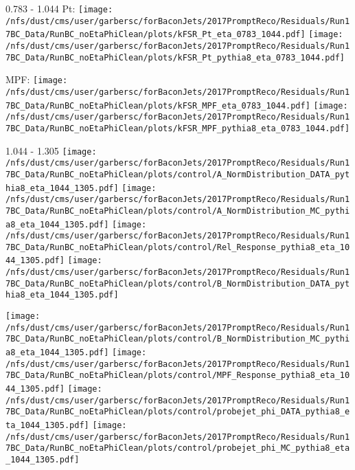 \documentclass[t,compress]{beamer}
\begin{document}
\begin{frame}{0.783 - 1.044}
	 Pt: \texttt{[image: /nfs/dust/cms/user/garbersc/forBaconJets/2017PromptReco/Residuals/Run17BC\_Data/RunBC\_noEtaPhiClean/plots/kFSR\_Pt\_eta\_0783\_1044.pdf]}
	\texttt{[image: /nfs/dust/cms/user/garbersc/forBaconJets/2017PromptReco/Residuals/Run17BC\_Data/RunBC\_noEtaPhiClean/plots/kFSR\_Pt\_pythia8\_eta\_0783\_1044.pdf]}
\newline

	 MPF: \texttt{[image: /nfs/dust/cms/user/garbersc/forBaconJets/2017PromptReco/Residuals/Run17BC\_Data/RunBC\_noEtaPhiClean/plots/kFSR\_MPF\_eta\_0783\_1044.pdf]}
	\texttt{[image: /nfs/dust/cms/user/garbersc/forBaconJets/2017PromptReco/Residuals/Run17BC\_Data/RunBC\_noEtaPhiClean/plots/kFSR\_MPF\_pythia8\_eta\_0783\_1044.pdf]}
\end{frame}

\begin{frame}{1.044 - 1.305}
	\texttt{[image: /nfs/dust/cms/user/garbersc/forBaconJets/2017PromptReco/Residuals/Run17BC\_Data/RunBC\_noEtaPhiClean/plots/control/A\_NormDistribution\_DATA\_pythia8\_eta\_1044\_1305.pdf]}
	\texttt{[image: /nfs/dust/cms/user/garbersc/forBaconJets/2017PromptReco/Residuals/Run17BC\_Data/RunBC\_noEtaPhiClean/plots/control/A\_NormDistribution\_MC\_pythia8\_eta\_1044\_1305.pdf]}
	\texttt{[image: /nfs/dust/cms/user/garbersc/forBaconJets/2017PromptReco/Residuals/Run17BC\_Data/RunBC\_noEtaPhiClean/plots/control/Rel\_Response\_pythia8\_eta\_1044\_1305.pdf]}
	\texttt{[image: /nfs/dust/cms/user/garbersc/forBaconJets/2017PromptReco/Residuals/Run17BC\_Data/RunBC\_noEtaPhiClean/plots/control/B\_NormDistribution\_DATA\_pythia8\_eta\_1044\_1305.pdf]}
\newline

	\texttt{[image: /nfs/dust/cms/user/garbersc/forBaconJets/2017PromptReco/Residuals/Run17BC\_Data/RunBC\_noEtaPhiClean/plots/control/B\_NormDistribution\_MC\_pythia8\_eta\_1044\_1305.pdf]}
	\texttt{[image: /nfs/dust/cms/user/garbersc/forBaconJets/2017PromptReco/Residuals/Run17BC\_Data/RunBC\_noEtaPhiClean/plots/control/MPF\_Response\_pythia8\_eta\_1044\_1305.pdf]}
	\texttt{[image: /nfs/dust/cms/user/garbersc/forBaconJets/2017PromptReco/Residuals/Run17BC\_Data/RunBC\_noEtaPhiClean/plots/control/probejet\_phi\_DATA\_pythia8\_eta\_1044\_1305.pdf]}
	\texttt{[image: /nfs/dust/cms/user/garbersc/forBaconJets/2017PromptReco/Residuals/Run17BC\_Data/RunBC\_noEtaPhiClean/plots/control/probejet\_phi\_MC\_pythia8\_eta\_1044\_1305.pdf]}
\end{frame}
\end{document}
